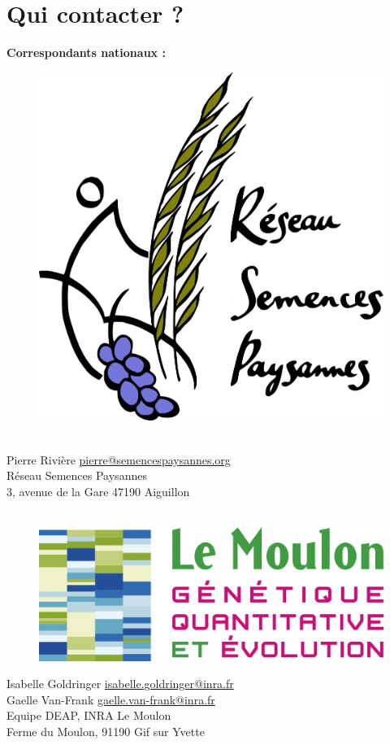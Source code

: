 \chapter*{Qui contacter ?}

\vfill

\noindent\textbf{\textsf{Correspondants nationaux :}} \\

\begin{figure}
\begin{center} \vspace{-20pt}
\includegraphics[width=.20\textwidth]{tex_files/Logo-RSP}
\end{center} \vspace{-20pt}
\end{figure}
\noindent
~\\
Pierre Rivière \href{mailto:pierre@semencespaysannes.org}{pierre@semencespaysannes.org} \\
Réseau Semences Paysannes \\
3, avenue de la Gare 47190 Aiguillon \\
~\\

\vfill

\begin{figure}
\begin{center} \vspace{-20pt}
\includegraphics[width=.20\textwidth]{tex_files/Logo-UMRGV}
\end{center} \vspace{-20pt}
\end{figure}
\noindent
Isabelle Goldringer \href{mailto:isabelle.goldringer@inra.fr}{isabelle.goldringer@inra.fr} \\
Gaelle Van-Frank \href{mailto:gaelle.van-frank@inra.fr}{gaelle.van-frank@inra.fr} \\
Equipe DEAP, INRA Le Moulon  \\
Ferme du Moulon, 91190 Gif sur Yvette \\

